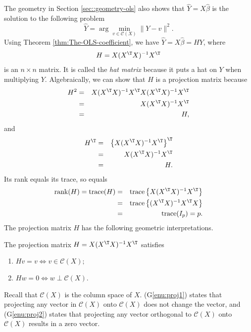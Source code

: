 The geometry  in  Section \ref{sec::geometry-ols} also shows that $\hat{Y}=X\hat{\beta}$ is the  solution
to the following problem
\[
\hat{Y}=\arg\min_{v\in\mathcal{C}(X)}\|Y-v\|^{2}.
\]
Using Theorem \ref{thm:The-OLS-coefficient}, we have $\hat{Y}=X\hat{\beta}=HY$, 
where 
\[
H=X(X^{\T}X)^{-1}X^{\T}
\]
is an $n\times n$ matrix. It is called the {\it hat matrix} because it
puts a hat on $Y$ when multiplying $Y$. Algebraically, we can show that
$H$ is a projection matrix because
\begin{eqnarray*}
H^{2} & = & X(X^{\T}X)^{-1}X^{\T}X(X^{\T}X)^{-1}X^{\T} \\
&=& X(X^{\T}X)^{-1}X^{\T} \\
&=& H,
\end{eqnarray*}
and
\begin{eqnarray*}
H^{\T} & = &\left\{ X(X^{\T}X)^{-1}X^{\T}\right\} ^{\T} \\
&=& X(X^{\T}X)^{-1}X^{\T} \\
&=& H.
\end{eqnarray*}
Its rank equals its trace, so 
equals 
\begin{eqnarray*}
\text{rank}(H) = 
\text{trace}(H)&=&\text{trace}\left\{ X(X^{\T}X)^{-1}X^{\T}\right\} \\
&=&\text{trace}\left\{ (X^{\T}X)^{-1}X^{\T}X\right\} \\
&=&\text{trace}(I_{p})=p.
\end{eqnarray*}
The projection matrix $H$ has the following geometric interpretations. 

\begin{proposition}\label{prop::projectionmatrix-geometry}
The projection matrix $H=X(X^{\T}X)^{-1}X^{\T}$ satisfies
\begin{enumerate}
[(G1)]
\item \label{enu:proj1}$Hv=v \Longleftrightarrow  v\in\mathcal{C}(X);$
\item \label{enu:proj2}$Hw=0 \Longleftrightarrow  w\perp\mathcal{C}(X).$
\end{enumerate}
\end{proposition}

Recall that $\mathcal{C}(X)$ is the column space of $X$. 
(G\ref{enu:proj1}) states that projecting any vector in $\mathcal{C}(X)$ onto $\mathcal{C}(X)$ does not change the vector, and (G\ref{enu:proj2}) states that projecting any vector orthogonal to $\mathcal{C}(X)$ onto $\mathcal{C}(X)$ results in a zero vector. 

